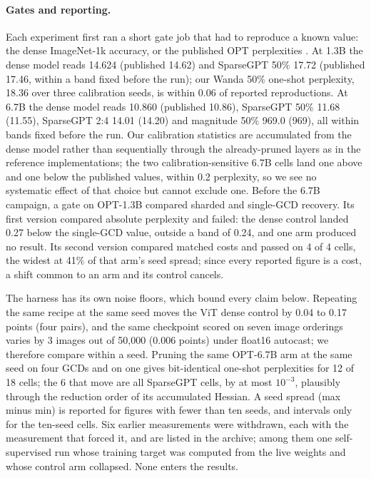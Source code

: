 \documentclass[11pt,a4paper]{article}
\begin{document}
\paragraph{Gates and reporting.} Each experiment first ran a short gate job that had to reproduce a known value: the dense ImageNet-1k accuracy, or the published OPT perplexities \cite{frantar2023sparsegpt}. At 1.3B the dense model reads 14.624 (published 14.62) and SparseGPT 50\% 17.72 (published 17.46, within a band fixed before the run); our Wanda 50\% one-shot perplexity, 18.36 over three calibration seeds, is within 0.06 of reported reproductions. At 6.7B the dense model reads 10.860 (published 10.86), SparseGPT 50\% 11.68 (11.55), SparseGPT 2:4 14.01 (14.20) and magnitude 50\% 969.0 (969), all within bands fixed before the run. Our calibration statistics are accumulated from the dense model rather than sequentially through the already-pruned layers as in the reference implementations; the two calibration-sensitive 6.7B cells land one above and one below the published values, within 0.2 perplexity, so we see no systematic effect of that choice but cannot exclude one. Before the 6.7B campaign, a gate on OPT-1.3B compared sharded and single-GCD recovery. Its first version compared absolute perplexity and failed: the dense control landed 0.27 below the single-GCD value, outside a band of 0.24, and one arm produced no result. Its second version compared matched costs and passed on 4 of 4 cells, the widest at 41\% of that arm's seed spread; since every reported figure is a cost, a shift common to an arm and its control cancels.

The harness has its own noise floors, which bound every claim below. Repeating the same recipe at the same seed moves the ViT dense control by 0.04 to 0.17 points (four pairs), and the same checkpoint scored on seven image orderings varies by 3 images out of 50{,}000 (0.006 points) under float16 autocast; we therefore compare within a seed. Pruning the same OPT-6.7B arm at the same seed on four GCDs and on one gives bit-identical one-shot perplexities for 12 of 18 cells; the 6 that move are all SparseGPT cells, by at most $10^{-3}$, plausibly through the reduction order of its accumulated Hessian. A seed spread (max minus min) is reported for figures with fewer than ten seeds, and intervals only for the ten-seed cells. Six earlier measurements were withdrawn, each with the measurement that forced it, and are listed in the archive; among them one self-supervised run whose training target was computed from the live weights and whose control arm collapsed. None enters the results.
\end{document}
